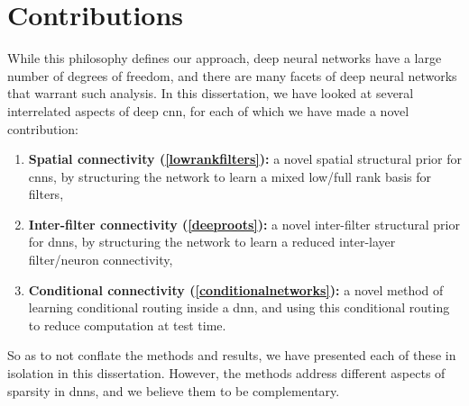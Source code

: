 \documentclass[thesis]{subfiles}
\begin{document}
\section{Contributions}
While this philosophy defines our approach, deep neural networks have a large number of degrees of freedom, and there are many facets of deep neural networks that warrant such analysis. In this dissertation, we have looked at several interrelated aspects of deep \gls{cnn}, for each of which we have made a novel contribution:
\begin{enumerate}[label= (\textbf{\roman*})]
	\item \textbf{Spatial connectivity (\cref{lowrankfilters}):} a novel spatial structural prior for \glspl{cnn}, by structuring the network to learn a mixed low/full rank basis for filters,
	\item \textbf{Inter-filter connectivity (\cref{deeproots}):} a novel inter-filter structural prior for \glspl{dnn}, by structuring the network to learn a reduced inter-layer filter/neuron connectivity,
	\item \textbf{Conditional connectivity (\cref{conditionalnetworks}):} a novel method of learning conditional routing inside a \gls{dnn}, and using this conditional routing to reduce computation at test time.
\end{enumerate}

So as to not conflate the methods and results, we have presented each of these in isolation in this dissertation. However, the methods address different aspects of sparsity in \glspl{dnn}, and we believe them to be complementary.
\end{document}
